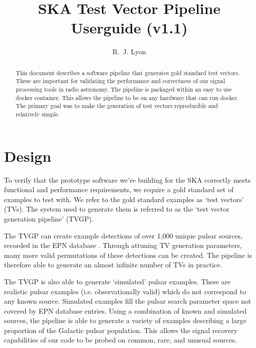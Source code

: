 \documentclass[preprint,authoryear,5p,twocolumn]{elsarticle_mod}
\begin{document}
\begin{frontmatter}

\title{SKA Test Vector Pipeline Userguide (v1.1)}

\author[UOM]{R.~J. Lyon}



\address[UOM]{School of Physics and Astronomy, The University of Manchester, Manchester M13 9PL, UK}

\begin{abstract}
This document describes a software pipeline that generates gold standard test vectors. These are important for validating the performance and correctness of our signal processing tools in radio astronomy. The pipeline is packaged within an easy to use docker container. This allows the pipeline to be on any hardware that can run docker. The primary goal was to make the generation of test vectors reproducible and relatively simple.
\end{abstract}
\end{frontmatter}
\section{Design}
To verify that the prototype software we're building for the SKA correctly meets functional and performance requirements, we require a gold standard set of examples to test with. We refer to the gold standard examples as `test vectors' (TVs). The system used to generate them is referred to as the `test vector generation pipeline' (TVGP).\newline

The TVGP can create example detections of over 1,000 unique pulsar sources, recorded in the EPN database \citep{EPN1:2018,EPN2:2018}. Through attuning TV generation parameters, many more valid permutations of these detections can be created. The pipeline is therefore able to generate an almost infinite number of TVs in practice.\newline

The TVGP is also able to generate `simulated' pulsar examples. These are realistic pulsar examples (i.e. observationally valid) which do not correspond to any known source. Simulated examples fill the pulsar search parameter space not covered by EPN database entries. Using a combination of known and simulated sources, the pipeline is able to generate a variety of examples describing a large proportion of the Galactic pulsar population. This allows the signal recovery capabilities of our code to be probed on common, rare, and unusual sources.\newline
\end{document}

